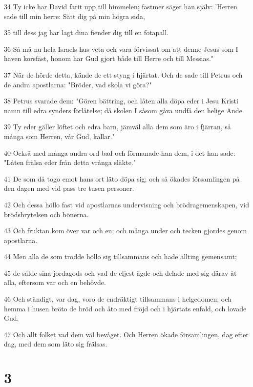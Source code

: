 \par 34 Ty icke har David farit upp till himmelen; fastmer säger han själv: 'Herren sade till min herre: Sätt dig på min högra sida,
\par 35 till dess jag har lagt dina fiender dig till en fotapall.
\par 36 Så må nu hela Israels hus veta och vara förvissat om att denne Jesus som I haven korsfäst, honom har Gud gjort både till Herre och till Messias."
\par 37 När de hörde detta, kände de ett styng i hjärtat. Och de sade till Petrus och de andra apostlarna: "Bröder, vad skola vi göra?"
\par 38 Petrus svarade dem: "Gören bättring, och låten alla döpa eder i Jesu Kristi namn till edra synders förlåtelse; då skolen I såsom gåva undfå den helige Ande.
\par 39 Ty eder gäller löftet och edra barn, jämväl alla dem som äro i fjärran, så många som Herren, vår Gud, kallar."
\par 40 Också med många andra ord bad och förmanade han dem, i det han sade: "Låten frälsa eder från detta vrånga släkte."
\par 41 De som då togo emot hans ort läto döpa sig; och så ökades församlingen på den dagen med vid pass tre tusen personer.
\par 42 Och dessa höllo fast vid apostlarnas undervisning och brödragemenskapen, vid brödsbrytelsen och bönerna.
\par 43 Och fruktan kom över var och en; och många under och tecken gjordes genom apostlarna.
\par 44 Men alla de som trodde höllo sig tillsammans och hade allting gemensamt;
\par 45 de sålde sina jordagods och vad de eljest ägde och delade med sig därav åt alla, eftersom var och en behövde.
\par 46 Och ständigt, var dag, voro de endräktigt tillsammans i helgedomen; och hemma i husen bröto de bröd och åto med fröjd och i hjärtats enfald, och lovade Gud.
\par 47 Och allt folket vad dem väl bevåget. Och Herren ökade församlingen, dag efter dag, med dem som läto sig frälsas.

\chapter{3}

